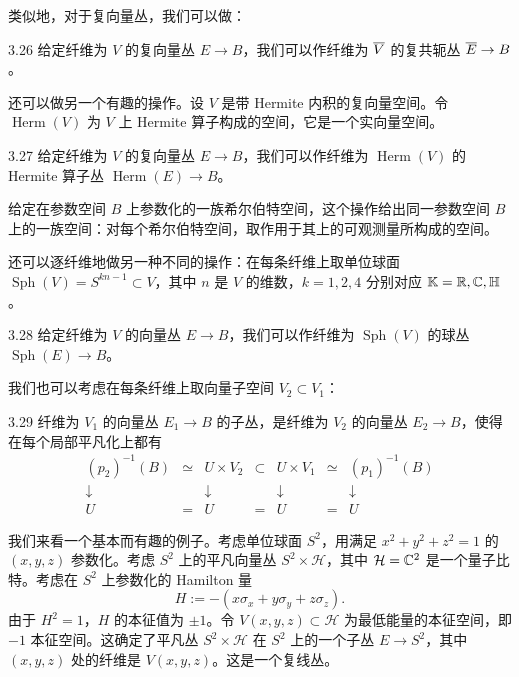 类似地，对于复向量丛，我们可以做：

\begin{definition}{3.26}
给定纤维为 $V$ 的复向量丛 $E\to B$，我们可以作纤维为 $\overline{V}$ 的复共轭丛 $\overline{E}\to B$。
\end{definition}

还可以做另一个有趣的操作。设 $V$ 是带 Hermite 内积的复向量空间。令 $\operatorname{Herm}(V)$ 为 $V$ 上 Hermite 算子构成的空间，它是一个实向量空间。

\begin{definition}{3.27}
给定纤维为 $V$ 的复向量丛 $E\to B$，我们可以作纤维为 $\operatorname{Herm}(V)$ 的 Hermite 算子丛 $\operatorname{Herm}(E)\to B$。
\end{definition}

给定在参数空间 $B$ 上参数化的一族希尔伯特空间，这个操作给出同一参数空间 $B$ 上的一族空间：对每个希尔伯特空间，取作用于其上的可观测量所构成的空间。

还可以逐纤维地做另一种不同的操作：在每条纤维上取单位球面 $\operatorname{Sph}(V)=S^{kn-1}\subset V$，其中 $n$ 是 $V$ 的维数，$k=1,2,4$ 分别对应 $\mathbb{K}=\mathbb{R},\mathbb{C},\mathbb{H}$。

\begin{definition}{3.28}
给定纤维为 $V$ 的向量丛 $E\to B$，我们可以作纤维为 $\operatorname{Sph}(V)$ 的球丛 $\operatorname{Sph}(E)\to B$。
\end{definition}

我们也可以考虑在每条纤维上取向量子空间 $V_2\subset V_1$：

\begin{definition}{3.29}
纤维为 $V_1$ 的向量丛 $E_1\to B$ 的子丛，是纤维为 $V_2$ 的向量丛 $E_2\to B$，使得在每个局部平凡化上都有
{\small\setlength{\arraycolsep}{4pt}
\[
\begin{array}{ccccccc}
(p_2)^{-1}(B) & \simeq & U\times V_2 & \subset & U\times V_1 & \simeq & (p_1)^{-1}(B)\\[3pt]
\downarrow & & \downarrow & & \downarrow & & \downarrow\\[3pt]
U & = & U & = & U & = & U
\end{array}
\tag{3.23}
\]
}
\end{definition}

我们来看一个基本而有趣的例子。考虑单位球面 $S^2$，用满足 $x^2+y^2+z^2=1$ 的 $(x,y,z)$ 参数化。考虑 $S^2$ 上的平凡向量丛 $S^2\times\mathcal{H}$，其中 $\mathcal{H}=\mathbb{C}^2$ 是一个量子比特。考虑在 $S^2$ 上参数化的 Hamilton 量
\[
H:=-(x\sigma_x+y\sigma_y+z\sigma_z).
\tag{3.24}
\]
由于 $H^2=1$，$H$ 的本征值为 $\pm1$。令 $V(x,y,z)\subset\mathcal{H}$ 为最低能量的本征空间，即 $-1$ 本征空间。这确定了平凡丛 $S^2\times\mathcal{H}$ 在 $S^2$ 上的一个子丛 $E\to S^2$，其中 $(x,y,z)$ 处的纤维是 $V(x,y,z)$。这是一个复线丛。

